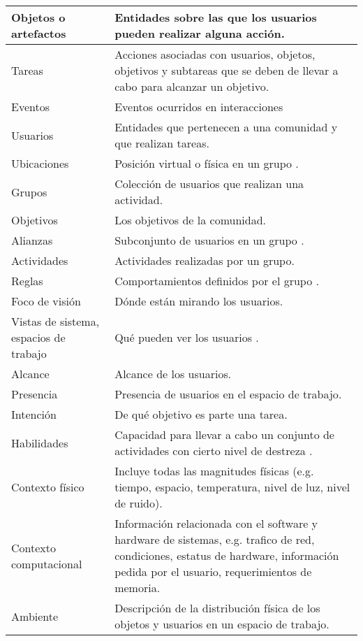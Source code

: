 \begin{center}
\begin{longtable}{|p{3cm}|p{10cm}|}
	Objetos o artefactos & Entidades sobre las que los usuarios pueden realizar alguna acci\'on. \\
	\hline
	Tareas & Acciones asociadas con usuarios, objetos, objetivos y subtareas que se deben de llevar a cabo para alcanzar un objetivo. \\
	\hline
	Eventos & Eventos ocurridos en interacciones\cite{montane2013context}\\
	\hline
	Usuarios & Entidades que pertenecen a una comunidad y que realizan tareas\cite{montane2013context}. \\
	\hline
	Ubicaciones & Posici\'on virtual o f\'isica en un grupo \cite{montane2013context}. \\
	\hline
	Grupos & Colecci\'on de usuarios que realizan una actividad\cite{montane2013context}. \\
	\hline
	Objetivos & Los objetivos de la comunidad\cite{montane2013context}. \\
	\hline
	Alianzas & Subconjunto de usuarios en un grupo \cite{montane2013context}. \\
	\hline
	Actividades & Actividades realizadas por un grupo\cite{montane2013context}. \\
	\hline
	Reglas & Comportamientos definidos por el grupo \cite{montane2013context}. \\
	\hline
	Foco de visi\'on & D\'onde est\'an mirando los usuarios\cite{gallardo2012framework}. \\
	\hline
	Vistas de sistema, espacios de trabajo & Qu\'e pueden ver los usuarios \cite{gallardo2012framework}. \\
	\hline
	Alcance & Alcance de los usuarios\cite{gallardo2012framework}. \\
	\hline
	Presencia & Presencia de usuarios en el espacio de trabajo\cite{gallardo2012framework}. \\
	\hline
	Intenci\'on & De qu\'e objetivo es parte una tarea\cite{gallardo2012framework}. \\
	\hline
	Habilidades & Capacidad para llevar a cabo un conjunto de actividades con cierto nivel de destreza \cite{decouchant2013adapting}. \\
	\hline
	Contexto f\'isico & Incluye todas las magnitudes f\'isicas (e.g. tiempo, espacio, temperatura, nivel de luz, nivel de ruido)\cite{hoyos2013domain}. \\
	\hline
	Contexto computacional & Informaci\'on relacionada con el software y hardware de sistemas, e.g. trafico de red, condiciones, estatus de hardware, informaci\'on pedida por el usuario, requerimientos de memoria\cite{hoyos2013domain}. \\
	\hline
	Ambiente & Descripci\'on de la distribuci\'on f\'isica de los objetos y usuarios en un espacio de trabajo\cite{hoyos2013domain}. \\
	\hline
\end{longtable}
\end{center}

